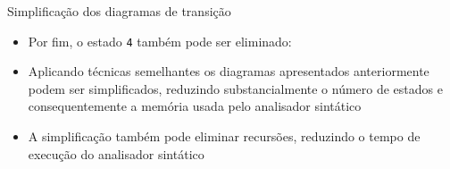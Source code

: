 \begin{frame}[fragile]{Simplificação dos diagramas de transição}

    \begin{itemize}
        \item Por fim, o estado \texttt{4} também pode ser eliminado:
        \begin{center}
        \end{center}
        \pause

        \item Aplicando técnicas semelhantes os diagramas apresentados anteriormente podem ser simplificados, reduzindo substancialmente o número de estados e
            consequentemente a memória usada pelo analisador sintático
        \pause

        \item A simplificação também pode eliminar recursões, reduzindo o tempo de execução do analisador sintático 
    \end{itemize}

\end{frame}

